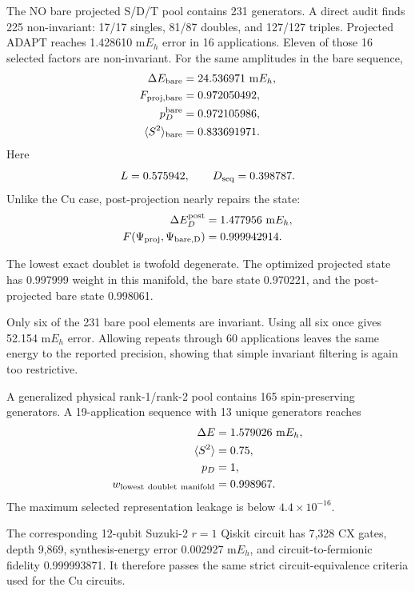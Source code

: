 \documentclass[
 aip,
 jcp,
 amsmath,amssymb,
 preprint
]{revtex4-2}
\begin{document}
The NO bare projected S/D/T pool contains 231 generators.
A direct audit finds 225 non-invariant:
17/17 singles, 81/87 doubles, and 127/127 triples.
Projected ADAPT reaches 1.428610 m$E_h$ error in 16 applications.
Eleven of those 16 selected factors are non-invariant.
For the same amplitudes in the bare sequence,
\begin{align}
\Delta E_{\rm bare}&=24.536971~{\rm m}E_h,\\
F_{\rm proj,bare}&=0.972050492,\\
p_D^{\rm bare}&=0.972105986,\\
\langle S^2\rangle_{\rm bare}&=0.833691971.
\end{align}
Here
\begin{equation}
L=0.575942,\qquad D_{\rm seq}=0.398787.
\end{equation}
Unlike the Cu case, post-projection nearly repairs the state:
\begin{align}
\Delta E_D^{\rm post}&=1.477956~{\rm m}E_h,\\
F(\Psi_{\rm proj},\Psi_{\rm bare,D})&=0.999942914.
\end{align}

The lowest exact doublet is twofold degenerate.
The optimized projected state has 0.997999 weight in this manifold, the bare state 0.970221, and the post-projected bare state 0.998061.

Only six of the 231 bare pool elements are invariant.
Using all six once gives 52.154 m$E_h$ error.
Allowing repeats through 60 applications leaves the same energy to the reported precision, showing that simple invariant filtering is again too restrictive.

A generalized physical rank-1/rank-2 pool contains 165 spin-preserving generators.
A 19-application sequence with 13 unique generators reaches
\begin{align}
\Delta E&=1.579026~{\rm m}E_h,\\
\langle S^2\rangle&=0.75,\\
p_D&=1,\\
w_{\rm lowest\ doublet\ manifold}&=0.998967.
\end{align}
The maximum selected representation leakage is below $4.4\times10^{-16}$.

The corresponding 12-qubit Suzuki-2 $r=1$ Qiskit circuit has 7,328 CX gates, depth 9,869, synthesis-energy error 0.002927 m$E_h$, and circuit-to-fermionic fidelity 0.999993871.
It therefore passes the same strict circuit-equivalence criteria used for the Cu circuits.
\end{document}
